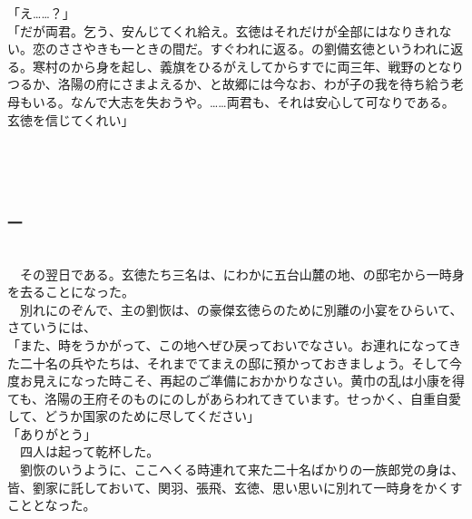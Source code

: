 \documentclass[
  paper=a5,
  fontsize=10pt,
  jafontsize=9.5pt,
  tate,                  %
  open_bracket_pos=nibu, %
]{jlreq}
\begin{document}
「え……？」\\


「だが両君。乞う、安んじてくれ給え。玄徳はそれだけが全部にはなりきれない。恋のささやきも一ときの間だ。すぐわれに返る。の劉備玄徳というわれに返る。寒村のから身を起し、義旗をひるがえしてからすでに両三年、戦野のとなりつるか、洛陽の府にさまよえるか、と故郷には今なお、わが子の我を待ち給う老母もいる。なんで大志を失おうや。……両君も、それは安心して可なりである。玄徳を信じてくれい」\\

\\

\subsection{}

\\

\subsubsection{一}

\\


　その翌日である。玄徳たち三名は、にわかに五台山麓の地、の邸宅から一時身を去ることになった。\\


　別れにのぞんで、主の劉恢は、の豪傑玄徳らのために別離の小宴をひらいて、さていうには、\\


「また、時をうかがって、この地へぜひ戻っておいでなさい。お連れになってきた二十名の兵やたちは、それまでてまえの邸に預かっておきましょう。そして今度お見えになった時こそ、再起のご準備におかかりなさい。黄巾の乱は小康を得ても、洛陽の王府そのものにのしがあらわれてきています。せっかく、自重自愛して、どうか国家のために尽してください」\\


「ありがとう」\\


　四人は起って乾杯した。\\


　劉恢のいうように、ここへくる時連れて来た二十名ばかりの一族郎党の身は、皆、劉家に託しておいて、関羽、張飛、玄徳、思い思いに別れて一時身をかくすこととなった。\\
\end{document}

